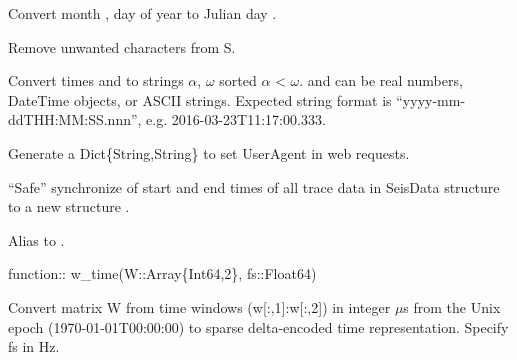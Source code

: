 \documentclass[letterpaper,11pt,english]{sphinxmanual}
\begin{document}
Convert month , day  of year  to Julian day .

Remove unwanted characters from S.

\begin{fulllineitems}
\label{\detokenize{src/Appendices/function_list:parsetimewin}}
\end{fulllineitems}


Convert times  and  to strings \(\alpha\), \(\omega\) sorted \(\alpha\) \textless{} \(\omega\).
 and  can be real numbers, DateTime objects, or ASCII strings.
Expected string format is “yyyy-mm-ddTHH:MM:SS.nnn”, e.g. 2016-03-23T11:17:00.333.

\begin{fulllineitems}
\label{\detokenize{src/Appendices/function_list:webhdr}}
\end{fulllineitems}


Generate a Dict\{String,String\} to set UserAgent in web requests.

“Safe” synchronize of start and end times of all trace data in SeisData structure  to a new structure .

\begin{fulllineitems}
\label{\detokenize{src/Appendices/function_list:u2d}}
\end{fulllineitems}


Alias to .

function:: w\_time(W::Array\{Int64,2\}, fs::Float64)

Convert matrix W from time windows (w{[}:,1{]}:w{[}:,2{]}) in integer \(\mu\)s from the Unix epoch (1970-01-01T00:00:00) to sparse delta-encoded time representation. Specify fs in Hz.
\end{document}
